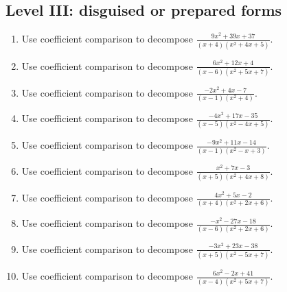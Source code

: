 \documentclass[11pt,oneside]{book}
\begin{document}
\subsection*{Level III: disguised or prepared forms}
\begin{enumerate}[leftmargin=*,label=\textbf{\arabic*.},itemsep=0.65\baselineskip]
\item Use coefficient comparison to decompose $\displaystyle \frac{9 x^{2} + 39 x + 37}{\left(x + 4\right) \left(x^{2} + 4 x + 5\right)}$.
\item Use coefficient comparison to decompose $\displaystyle \frac{6 x^{2} + 12 x + 4}{\left(x - 6\right) \left(x^{2} + 5 x + 7\right)}$.
\item Use coefficient comparison to decompose $\displaystyle \frac{- 2 x^{2} + 4 x - 7}{\left(x - 1\right) \left(x^{2} + 4\right)}$.
\item Use coefficient comparison to decompose $\displaystyle \frac{- 4 x^{2} + 17 x - 35}{\left(x - 5\right) \left(x^{2} - 4 x + 5\right)}$.
\item Use coefficient comparison to decompose $\displaystyle \frac{- 9 x^{2} + 11 x - 14}{\left(x - 1\right) \left(x^{2} - x + 3\right)}$.
\item Use coefficient comparison to decompose $\displaystyle \frac{x^{2} + 7 x - 3}{\left(x + 5\right) \left(x^{2} + 4 x + 8\right)}$.
\item Use coefficient comparison to decompose $\displaystyle \frac{4 x^{2} + 5 x - 2}{\left(x + 4\right) \left(x^{2} + 2 x + 6\right)}$.
\item Use coefficient comparison to decompose $\displaystyle \frac{- x^{2} - 27 x - 18}{\left(x - 6\right) \left(x^{2} + 2 x + 6\right)}$.
\item Use coefficient comparison to decompose $\displaystyle \frac{- 3 x^{2} + 23 x - 38}{\left(x + 5\right) \left(x^{2} - 5 x + 7\right)}$.
\item Use coefficient comparison to decompose $\displaystyle \frac{6 x^{2} - 2 x + 41}{\left(x - 4\right) \left(x^{2} + 5 x + 7\right)}$.
\end{enumerate}
\end{document}
